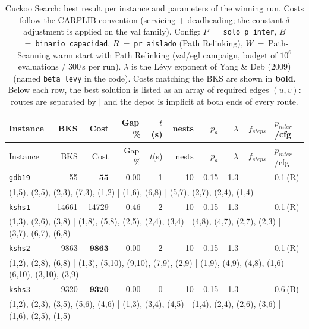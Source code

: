 \begingroup\scriptsize
\begin{longtable}{lrrrrrrrrl}
\caption{Cuckoo Search: best result per instance and parameters of the winning run. Costs follow the CARPLIB convention (servicing + deadheading; the constant $\delta$ adjustment is applied on the val family). Config: $P$~=~\texttt{solo\_p\_inter}, $B$~=~\texttt{binario\_capacidad}, $R$~=~\texttt{pr\_aislado} (Path Relinking), $W$~=~Path-Scanning warm start with Path Relinking (val/egl campaign, budget of $10^6$ evaluations / 300\,s per run). $\lambda$ is the L\'evy exponent of Yang \& Deb (2009) (named \texttt{beta\_levy} in the code). Costs matching the BKS are shown in \textbf{bold}. Below each row, the best solution is listed as an array of required edges $(u,v)$: routes are separated by $|$ and the depot is implicit at both ends of every route.}\label{tab:cuckoo-per-instance}\\
\toprule
Instance & BKS & Cost & Gap\,\% & $t$(s) & nests & $p_a$ & $\lambda$ & $f_{steps}$ & $p_{inter}$/cfg \\
\midrule
\endfirsthead
\toprule
Instance & BKS & Cost & Gap\,\% & $t$(s) & nests & $p_a$ & $\lambda$ & $f_{steps}$ & $p_{inter}$/cfg \\
\midrule
\endhead
\bottomrule
\endfoot
\texttt{gdb19} & 55 & $\mathbf{55}$ & 0.00 & 1 & 10 & 0.15 & 1.3 & -- & 0.1\,(R) \\
\multicolumn{10}{p{0.96\linewidth}}{\tiny\raggedright\arraybackslash (1,5), (2,5), (2,3), (7,3), (1,2) | (1,6), (6,8) | (5,7), (2,7), (2,4), (1,4)} \\[2pt]
\texttt{kshs1} & 14661 & 14729 & 0.46 & 2 & 10 & 0.15 & 1.3 & -- & 0.1\,(R) \\
\multicolumn{10}{p{0.96\linewidth}}{\tiny\raggedright\arraybackslash (1,3), (2,6), (3,8) | (1,8), (5,8), (2,5), (2,4), (3,4) | (4,8), (4,7), (2,7), (2,3) | (3,7), (6,7), (6,8)} \\[2pt]
\texttt{kshs2} & 9863 & $\mathbf{9863}$ & 0.00 & 2 & 10 & 0.15 & 1.3 & -- & 0.1\,(R) \\
\multicolumn{10}{p{0.96\linewidth}}{\tiny\raggedright\arraybackslash (1,2), (2,8), (6,8) | (1,3), (5,10), (9,10), (7,9), (2,9) | (1,9), (4,9), (4,8), (1,6) | (6,10), (3,10), (3,9)} \\[2pt]
\texttt{kshs3} & 9320 & $\mathbf{9320}$ & 0.00 & 0 & 10 & 0.15 & 1.3 & -- & 0.6\,(B) \\
\multicolumn{10}{p{0.96\linewidth}}{\tiny\raggedright\arraybackslash (1,2), (2,3), (3,5), (5,6), (4,6) | (1,3), (3,4), (4,5) | (1,4), (2,4), (2,6), (3,6) | (1,6), (2,5), (1,5)} \\[2pt]

\end{longtable}
